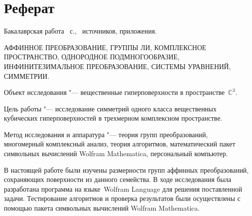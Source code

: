 \documentclass[../main.tex]{subfiles}
\begin{document}
\newpage
\section*{\centering Реферат}

\par\noindent Бакалаврская работа ~с., \ источников,  приложения.\\
\vspace{0.5cm}

\par\noindent АФФИННОЕ ПРЕОБРАЗОВАНИЕ, ГРУППЫ ЛИ, КОМПЛЕКСНОЕ ПРОСТРАНСТВО, ОДНОРОДНОЕ ПОДМНОГООБРАЗИЕ, ИНФИНИТЕЗИМАЛЬНОЕ ПРЕОБРАЗОВАНИЕ, СИСТЕМЫ УРАВНЕНИЙ, СИММЕТРИИ.\\

\par\noindent Объект исследования "--- вещественные гиперповерхности в пространстве~$\mathbb{C}^3$.\\
\par\noindent Цель работы "--- исследование симметрий одного класса вещественных кубических гиперповерхностей в трехмерном комплексном пространстве.\\
\par\noindent Метод исследования и аппаратура "--- теория групп преобразований, многомерный комплексный анализ, теория алгоритмов, математический пакет символьных вычислений {\ttfamily Wolfram Mathematica}, персональный компьютер.\\

\par\noindent В настоящей работе были изучены размерности групп аффинных преобразований, сохраняющих поверхности из данного семейства. В ходе исследования была разработана программа на языке~{\ttfamily Wolfram Language} для решения поставленной задачи. Тестирование алгоритмов и проверка результатов были осуществлены с помощью пакета символьных вычислений {\ttfamily Wolfram Mathematica}.

\clearpage
\normalsize
\end{document}
